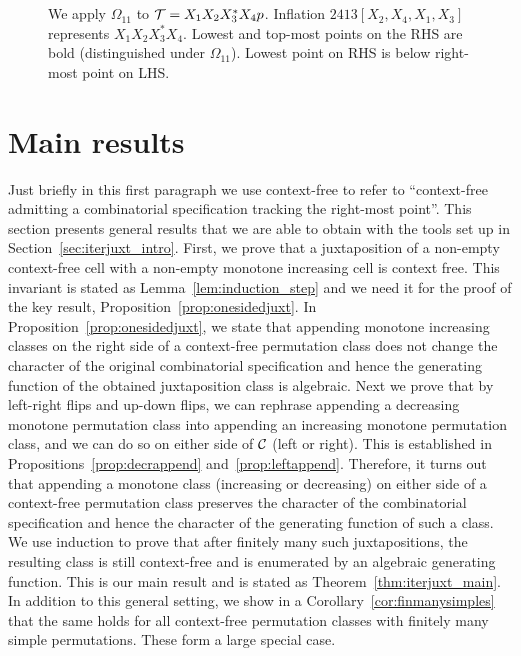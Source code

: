 \documentclass[12pt, a4paper, twoside]{report}
\begin{document}
\begin{figure}[!ht]
\\ \ \\
\caption{We apply $\Omega_{11}$ to $\mathcal{T} = X_1X_2X_3^*X_4p$. Inflation $2413[X_2,X_4,X_1,X_3]$ represents $X_1X_2X_3^*X_4$. Lowest and top-most points on the RHS are bold (distinguished under $\Omega_{11}$). Lowest point on RHS is below right-most point on LHS.}
\label{fig:iterjuxt_omega11action}
\end{figure}

\newpage
\section{Main results}
\label{sec:iterjuxt_main}

Just briefly in this first paragraph we use context-free to refer to ``context-free admitting a combinatorial specification tracking the right-most point''. This section presents general results that we are able to obtain with the tools set up in Section~\ref{sec:iterjuxt_intro}. First, we prove that a juxtaposition of a non-empty context-free cell with a non-empty monotone increasing cell is context free. This invariant is stated as Lemma~\ref{lem:induction_step} and we need it for the proof of the key result, Proposition~\ref{prop:onesidedjuxt}. In Proposition~\ref{prop:onesidedjuxt}, we state that appending monotone increasing classes on the right side of a context-free permutation class does not change the character of the original combinatorial specification and hence the generating function of the obtained juxtaposition class is algebraic. Next we prove that by left-right flips and up-down flips, we can rephrase appending a decreasing monotone permutation class into appending an increasing monotone permutation class, and we can do so on either side of $\mathcal{C}$ (left or right). This is established in Propositions~\ref{prop:decrappend} and~\ref{prop:leftappend}. Therefore, it turns out that appending a monotone class (increasing or decreasing) on either side of a context-free permutation class preserves the character of the combinatorial specification and hence the character of the generating function of such a class. We use induction to prove that after finitely many such juxtapositions, the resulting class is still context-free and is enumerated by an algebraic generating function. This is our main result and is stated as Theorem~\ref{thm:iterjuxt_main}. In addition to this general setting, we show in a Corollary~\ref{cor:finmanysimples} that the same holds for all context-free permutation classes with finitely many simple permutations. These form a large special case.
\end{document}
